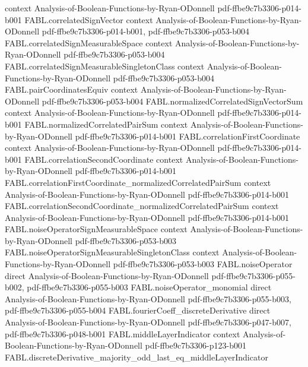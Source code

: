 \begin{theorem}
  {context}
  {Analysis-of-Boolean-Functions-by-Ryan-ODonnell}
  {pdf-ffbe9c7b3306-p014-b001}
\proofstep
  {FABL.correlatedSignVector}
  {context}
  {Analysis-of-Boolean-Functions-by-Ryan-ODonnell}
  {pdf-ffbe9c7b3306-p014-b001,
    pdf-ffbe9c7b3306-p053-b004}
\proofstep
  {FABL.correlatedSignMeasurableSpace}
  {context}
  {Analysis-of-Boolean-Functions-by-Ryan-ODonnell}
  {pdf-ffbe9c7b3306-p053-b004}
\proofstep
  {FABL.correlatedSignMeasurableSingletonClass}
  {context}
  {Analysis-of-Boolean-Functions-by-Ryan-ODonnell}
  {pdf-ffbe9c7b3306-p053-b004}
\proofstep
  {FABL.pairCoordinatesEquiv}
  {context}
  {Analysis-of-Boolean-Functions-by-Ryan-ODonnell}
  {pdf-ffbe9c7b3306-p053-b004}
\proofstep
  {FABL.normalizedCorrelatedSignVectorSum}
  {context}
  {Analysis-of-Boolean-Functions-by-Ryan-ODonnell}
  {pdf-ffbe9c7b3306-p014-b001}
\proofstep
  {FABL.normalizedCorrelatedPairSum}
  {context}
  {Analysis-of-Boolean-Functions-by-Ryan-ODonnell}
  {pdf-ffbe9c7b3306-p014-b001}
\proofstep
  {FABL.correlationFirstCoordinate}
  {context}
  {Analysis-of-Boolean-Functions-by-Ryan-ODonnell}
  {pdf-ffbe9c7b3306-p014-b001}
\proofstep
  {FABL.correlationSecondCoordinate}
  {context}
  {Analysis-of-Boolean-Functions-by-Ryan-ODonnell}
  {pdf-ffbe9c7b3306-p014-b001}
\proofstep
  {FABL.correlationFirstCoordinate_normalizedCorrelatedPairSum}
  {context}
  {Analysis-of-Boolean-Functions-by-Ryan-ODonnell}
  {pdf-ffbe9c7b3306-p014-b001}
\proofstep
  {FABL.correlationSecondCoordinate_normalizedCorrelatedPairSum}
  {context}
  {Analysis-of-Boolean-Functions-by-Ryan-ODonnell}
  {pdf-ffbe9c7b3306-p014-b001}
\proofstep
  {FABL.noiseOperatorSignMeasurableSpace}
  {context}
  {Analysis-of-Boolean-Functions-by-Ryan-ODonnell}
  {pdf-ffbe9c7b3306-p053-b003}
\proofstep
  {FABL.noiseOperatorSignMeasurableSingletonClass}
  {context}
  {Analysis-of-Boolean-Functions-by-Ryan-ODonnell}
  {pdf-ffbe9c7b3306-p053-b003}
\proofstep
  {FABL.noiseOperator}
  {direct}
  {Analysis-of-Boolean-Functions-by-Ryan-ODonnell}
  {pdf-ffbe9c7b3306-p055-b002,
    pdf-ffbe9c7b3306-p055-b003}
\proofstep
  {FABL.noiseOperator_monomial}
  {direct}
  {Analysis-of-Boolean-Functions-by-Ryan-ODonnell}
  {pdf-ffbe9c7b3306-p055-b003,
    pdf-ffbe9c7b3306-p055-b004}
\proofstep
  {FABL.fourierCoeff_discreteDerivative}
  {direct}
  {Analysis-of-Boolean-Functions-by-Ryan-ODonnell}
  {pdf-ffbe9c7b3306-p047-b007,
    pdf-ffbe9c7b3306-p048-b001}
\proofstep
  {FABL.middleLayerIndicator}
  {context}
  {Analysis-of-Boolean-Functions-by-Ryan-ODonnell}
  {pdf-ffbe9c7b3306-p123-b001}
\proofstep
  {FABL.discreteDerivative_majority_odd_last_eq_middleLayerIndicator}

\end{theorem}
